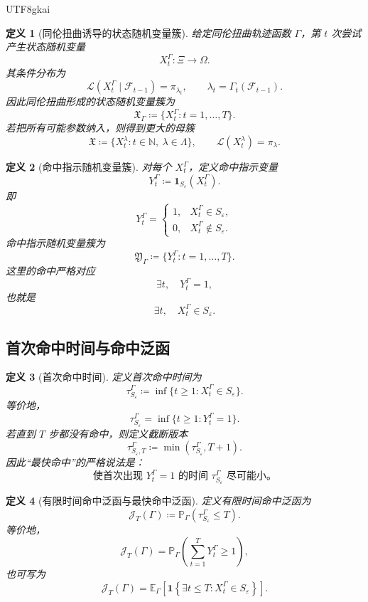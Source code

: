 \documentclass[12pt]{article}
\newtheorem{definition}{定义}[section]
\newcommand{\NN}{\mathbb{N}}
\newcommand{\DefEq}{\coloneqq}
\begin{document}
\begin{CJK*}{UTF8}{gkai}
\begin{definition}[同伦扭曲诱导的状态随机变量簇]
\label{def:tex55-homtwist-state-rv-cluster}
给定同伦扭曲轨迹函数 \(\Gamma\)，第 \(t\) 次尝试产生状态随机变量
\[
  X_t^\Gamma:\Xi\to\Omega.
\]
其条件分布为
\[
  \mathcal L(X_t^\Gamma\mid\mathcal F_{t-1})
  =
  \pi_{\lambda_t},
  \qquad
  \lambda_t=\Gamma_t(\mathcal F_{t-1}).
\]
因此同伦扭曲形成的状态随机变量簇为
\[
  \boxed{
  \mathfrak X_\Gamma
  \DefEq
  \{X_t^\Gamma:t=1,\ldots,T\}.
  }
\]
若把所有可能参数纳入，则得到更大的母簇
\[
  \boxed{
  \mathfrak X
  \DefEq
  \{X_t^\lambda:t\in\NN,\ \lambda\in\Lambda\},
  \qquad
  \mathcal L(X_t^\lambda)=\pi_\lambda.
  }
\]
\end{definition}

\begin{definition}[命中指示随机变量簇]
\label{def:tex55-homtwist-hit-indicator}
对每个 \(X_t^\Gamma\)，定义命中指示变量
\[
  Y_t^\Gamma
  \DefEq
  \mathbf 1_{S_\varepsilon}(X_t^\Gamma).
\]
即
\[
  Y_t^\Gamma=
  \begin{cases}
    1,&X_t^\Gamma\in S_\varepsilon,\\
    0,&X_t^\Gamma\notin S_\varepsilon.
  \end{cases}
\]
命中指示随机变量簇为
\[
  \boxed{
  \mathfrak Y_\Gamma
  \DefEq
  \{Y_t^\Gamma:t=1,\ldots,T\}.
  }
\]
这里的命中严格对应
\[
  \exists t,\quad Y_t^\Gamma=1,
\]
也就是
\[
  \exists t,\quad X_t^\Gamma\in S_\varepsilon.
\]
\end{definition}

\subsection{首次命中时间与命中泛函}
\label{subsec:tex55-homtwist-hitting-time-functional}

\begin{definition}[首次命中时间]
\label{def:tex55-homtwist-first-hit-time}
定义首次命中时间为
\[
  \tau_{S_\varepsilon}^\Gamma
  \DefEq
  \inf\{t\ge1:X_t^\Gamma\in S_\varepsilon\}.
\]
等价地，
\[
  \tau_{S_\varepsilon}^\Gamma
  =
  \inf\{t\ge1:Y_t^\Gamma=1\}.
\]
若直到 \(T\) 步都没有命中，则定义截断版本
\[
  \tau_{S_\varepsilon,T}^\Gamma
  \DefEq
  \min(\tau_{S_\varepsilon}^\Gamma,T+1).
\]
因此“最快命中”的严格说法是：
\[
  \boxed{
  \text{使首次出现 }Y_t^\Gamma=1\text{ 的时间 }\tau_{S_\varepsilon}^\Gamma\text{ 尽可能小。}
  }
\]
\end{definition}

\begin{definition}[有限时间命中泛函与最快命中泛函]
\label{def:tex55-homtwist-hit-functional}
定义有限时间命中泛函为
\[
  \mathcal J_T(\Gamma)
  \DefEq
  \mathbb P_\Gamma(\tau_{S_\varepsilon}^\Gamma\le T).
\]
等价地，
\[
  \mathcal J_T(\Gamma)
  =
  \mathbb P_\Gamma
  \left(
  \sum_{t=1}^{T}Y_t^\Gamma\ge1
  \right),
\]
也可写为
\[
  \mathcal J_T(\Gamma)
  =
  \mathbb E_\Gamma
  \left[
  \mathbf 1
  \left\{
  \exists t\le T:X_t^\Gamma\in S_\varepsilon
  \right\}
  \right].
\]


\end{definition}
\end{CJK*}
\end{document}
